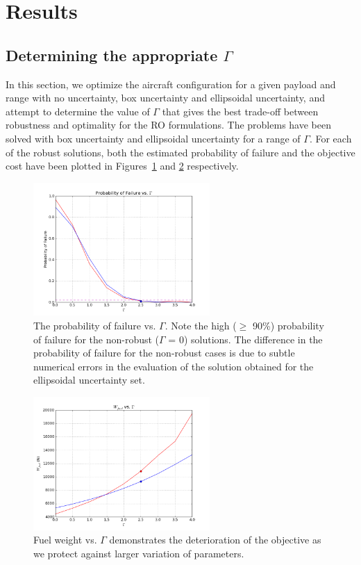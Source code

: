 \section{Results}

\subsection{Determining the appropriate $\Gamma$}

In this section, we optimize the aircraft configuration for a given payload and
range with no uncertainty, box uncertainty and ellipsoidal uncertainty,
and attempt to determine the value of $\Gamma$ that gives the best trade-off between robustness
and optimality for the RO formulations. The problems have been solved with box uncertainty
and ellipsoidal uncertainty for a range of $\Gamma$. For each of the robust solutions,
both the estimated probability of failure and the objective cost have been plotted
in Figures~\ref{fig:probOfFail_vs_Gamma} and \ref{fig:W_f_vs_Gamma} respectively.

\begin{figure}[h]
\centering
\includegraphics[width=0.6\textwidth]{probOfFail_vs_Gamma.png}
\caption{The probability of failure vs. $\Gamma$. Note the high ($\geq$ 90\%) probability of failure for the non-robust ($\Gamma$ = 0) solutions.
The difference in the probability of failure for the non-robust cases is due to subtle numerical errors in
the evaluation of the solution obtained for the ellipsoidal uncertainty set.}
\label{fig:probOfFail_vs_Gamma}
\end{figure}

\begin{figure}
\centering
\includegraphics[width=0.6\textwidth]{W_f_vs_Gamma.png}
\caption{Fuel weight vs. $\Gamma$ demonstrates the deterioration of the objective as we protect against larger variation of parameters.}
\label{fig:W_f_vs_Gamma}
\end{figure}

